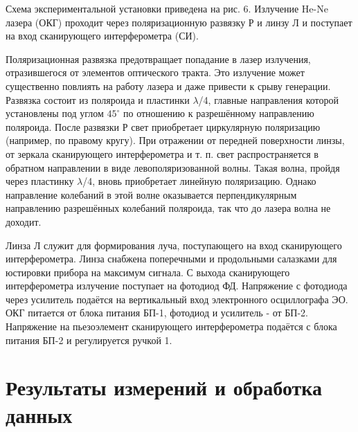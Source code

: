\documentclass[12pt,a4paper]{article}
\begin{document}
\par Схема экспериментальной установки приведена на рис. 6. Излучение He-Ne лазера (ОКГ) проходит через поляризационную развязку Р и линзу Л и поступает на вход сканирующего интерферометра (СИ).

\par Поляризационная развязка предотвращает попадание в лазер излучения, отразившегося от элементов оптического тракта. Это излучение может существенно повлиять на работу лазера и даже привести к срыву генерации. Развязка состоит из поляроида и пластинки $\lambda$/4, главные направления которой установлены под углом $45^\circ$ по отношению к разрешённому направлению поляроида. После развязки Р свет приобретает циркулярную поляризацию (например, по правому кругу). При отражении от передней поверхности линзы, от зеркала сканирующего интерферометра и т. п. свет распространяется в обратном направлении в виде левополяризованной волны. Такая волна, пройдя через пластинку $\lambda$/4, вновь приобретает линейную поляризацию. Однако направление колебаний в этой волне оказывается перпендикулярным направлению разрешённых колебаний поляроида, так что до лазера волна не доходит.

\par Линза Л служит для формирования луча, поступающего на вход
сканирующего интерферометра. Линза снабжена поперечными и продольными салазками для юстировки прибора на максимум сигнала. С выхода сканирующего интерферометра излучение поступает на фотодиод ФД. Напряжение с фотодиода через усилитель подаётся на
вертикальный вход электронного осциллографа ЭО. ОКГ питается от блока питания БП-1, фотодиод и усилитель - от БП-2. Напряжение на пьезоэлемент сканирующего интерферометра подаётся с блока питания БП-2 и регулируется ручкой 1.

\newpage

\section{Результаты измерений и обработка данных}
\end{document}
